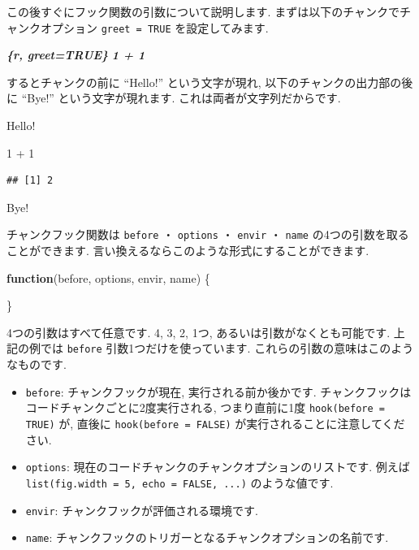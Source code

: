 \documentclass[
  11pt,
]{bxjsreport}
\newenvironment{Shaded}{\begin{snugshade}}{\end{snugshade}}
\newcommand{\ControlFlowTok}[1]{\textcolor[rgb]{0.13,0.29,0.53}{\textbf{#1}}}
\newcommand{\DecValTok}[1]{\textcolor[rgb]{0.00,0.00,0.81}{#1}}
\newcommand{\InformationTok}[1]{\textcolor[rgb]{0.56,0.35,0.01}{\textbf{\textit{#1}}}}
\newcommand{\NormalTok}[1]{#1}
\newcommand{\SpecialCharTok}[1]{\textcolor[rgb]{0.00,0.00,0.00}{#1}}
\renewenvironment{quote}{\begin{VF}}{\end{VF}}
\renewenvironment{quote}{\def\FrameCommand{{\color{quotebarcolor}{\vrule width 3pt}}\hspace{10pt}}\MakeFramed{\advance\hsize-\width\FrameRestore}}{\endMakeFramed}
\begin{document}
この後すぐにフック関数の引数について説明します. まずは以下のチャンクでチャンクオプション \texttt{greet = TRUE} を設定してみます.

\begin{Shaded}
\begin{Highlighting}[]
\InformationTok{\textasciigrave{}\textasciigrave{}\textasciigrave{}\{r, greet=TRUE\}}
\InformationTok{1 + 1}
\InformationTok{\textasciigrave{}\textasciigrave{}\textasciigrave{}}
\end{Highlighting}
\end{Shaded}

するとチャンクの前に ``Hello!'' という文字が現れ, 以下のチャンクの出力部の後に ``Bye!'' という文字が現れます. これは両者が文字列だからです.

\begin{quote}
Hello!

\begin{Shaded}
\begin{Highlighting}[numbers=left,,]
\DecValTok{1} \SpecialCharTok{+} \DecValTok{1}
\end{Highlighting}
\end{Shaded}

\begin{verbatim}
## [1] 2
\end{verbatim}

Bye!
\end{quote}

チャンクフック関数は \texttt{before} ・ \texttt{options} ・ \texttt{envir} ・ \texttt{name} の4つの引数を取ることができます. 言い換えるならこのような形式にすることができます.

\begin{Shaded}
\begin{Highlighting}[]
\ControlFlowTok{function}\NormalTok{(before, options, envir, name) \{}

\NormalTok{\}}
\end{Highlighting}
\end{Shaded}

4つの引数はすべて任意です. 4, 3, 2, 1つ, あるいは引数がなくとも可能です. 上記の例では \texttt{before} 引数1つだけを使っています. これらの引数の意味はこのようなものです.

\begin{itemize}
\item
  \texttt{before}: チャンクフックが現在, 実行される前か後かです. チャンクフックはコードチャンクごとに2度実行される, つまり直前に1度 \texttt{hook(before = TRUE)} が, 直後に \texttt{hook(before = FALSE)} が実行されることに注意してください.
\item
  \texttt{options}: 現在のコードチャンクのチャンクオプションのリストです. 例えば \texttt{list(fig.width = 5, echo = FALSE, ...)} のような値です.
\item
  \texttt{envir}: チャンクフックが評価される環境です.
\item
  \texttt{name}: チャンクフックのトリガーとなるチャンクオプションの名前です.
\end{itemize}
\end{document}
